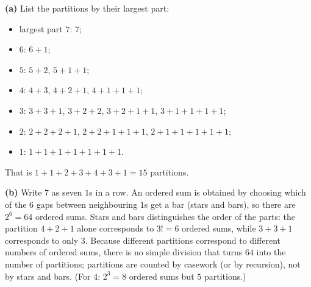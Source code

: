 \textbf{(a)} List the partitions by their largest part:
\begin{itemize}
\item largest part $7$: $7$;
\item $6$: $6+1$;
\item $5$: $5+2$, $5+1+1$;
\item $4$: $4+3$, $4+2+1$, $4+1+1+1$;
\item $3$: $3+3+1$, $3+2+2$, $3+2+1+1$, $3+1+1+1+1$;
\item $2$: $2+2+2+1$, $2+2+1+1+1$, $2+1+1+1+1+1$;
\item $1$: $1+1+1+1+1+1+1$.
\end{itemize}
That is $1+1+2+3+4+3+1=\boxed{15}$ partitions.

\textbf{(b)} Write $7$ as seven $1$s in a row. An ordered sum is obtained by choosing which of the $6$ gaps between neighbouring $1$s get a bar (stars and bars), so there are $2^6=\boxed{64}$ ordered sums. Stars and bars distinguishes the order of the parts: the partition $4+2+1$ alone corresponds to $3!=6$ ordered sums, while $3+3+1$ corresponds to only $3$. Because different partitions correspond to different numbers of ordered sums, there is no simple division that turns $64$ into the number of partitions; partitions are counted by casework (or by recursion), not by stars and bars. (For $4$: $2^3=8$ ordered sums but $5$ partitions.)
